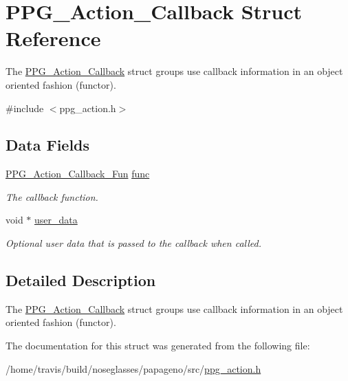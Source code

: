\hypertarget{structPPG__Action__Callback}{\section{P\-P\-G\-\_\-\-Action\-\_\-\-Callback Struct Reference}
\label{structPPG__Action__Callback}
}


The \hyperlink{structPPG__Action__Callback}{P\-P\-G\-\_\-\-Action\-\_\-\-Callback} struct groups use callback information in an object oriented fashion (functor).  




{\ttfamily \#include $<$ppg\-\_\-action.\-h$>$}

\subsection*{Data Fields}
\begin{DoxyCompactItemize}
\item 
\hypertarget{structPPG__Action__Callback_a8a33ce15e7b841571ec2f0051b26e709}{\hyperlink{ppg__action_8h_abccce75a464e29a0fc3c53da4d25b6fc}{P\-P\-G\-\_\-\-Action\-\_\-\-Callback\-\_\-\-Fun} \hyperlink{structPPG__Action__Callback_a8a33ce15e7b841571ec2f0051b26e709}{func}}\label{structPPG__Action__Callback_a8a33ce15e7b841571ec2f0051b26e709}

\begin{DoxyCompactList}\small\item\em The callback function. \end{DoxyCompactList}\item 
\hypertarget{structPPG__Action__Callback_af05d9553d818beb6d8c510c45e6061d9}{void $\ast$ \hyperlink{structPPG__Action__Callback_af05d9553d818beb6d8c510c45e6061d9}{user\-\_\-data}}\label{structPPG__Action__Callback_af05d9553d818beb6d8c510c45e6061d9}

\begin{DoxyCompactList}\small\item\em Optional user data that is passed to the callback when called. \end{DoxyCompactList}\end{DoxyCompactItemize}


\subsection{Detailed Description}
The \hyperlink{structPPG__Action__Callback}{P\-P\-G\-\_\-\-Action\-\_\-\-Callback} struct groups use callback information in an object oriented fashion (functor). 

The documentation for this struct was generated from the following file\-:\begin{DoxyCompactItemize}
\item 
/home/travis/build/noseglasses/papageno/src/\hyperlink{ppg__action_8h}{ppg\-\_\-action.\-h}\end{DoxyCompactItemize}
